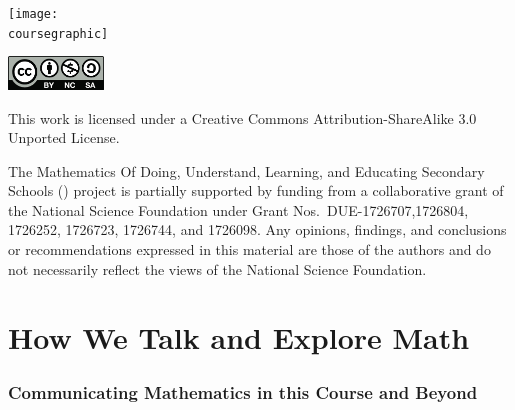 \documentclass[11pt]{article}
\theoremstyle{definition}
\begin{document}
\maketitle
\ifthenelse{\equal{\coursegraphic}{}} %
	{}
	{\begin{center}\texttt{[image: \\coursegraphic]}\end{center}}
	
\vfill 
\begin{center} \includegraphics[width=1in]{by-nc-sa.png} \end{center}
\footnotesize{ This work is licensed under a Creative Commons Attribution-ShareAlike 3.0 Unported License. }

\footnotesize{
The Mathematics Of Doing, Understand, Learning, and Educating Secondary Schools (\MODULES) project is partially supported by funding from a collaborative grant of the National Science Foundation under Grant Nos.~DUE-1726707,1726804, 1726252, 1726723, 1726744, and 1726098.  Any opinions, findings, and conclusions or recommendations expressed in this material are those of the authors and do not necessarily reflect the views of the National Science Foundation.}
\newpage
\thispagestyle{plain}   
\listoftodos
\tableofcontents
\newpage {}
\newpage 
\part{How We Talk and Explore Math} 

\setcounter{section}{-1}

\newpage \section{Communicating Mathematics in this Course and Beyond}\label{section: communicating mathematics}
\end{document}
